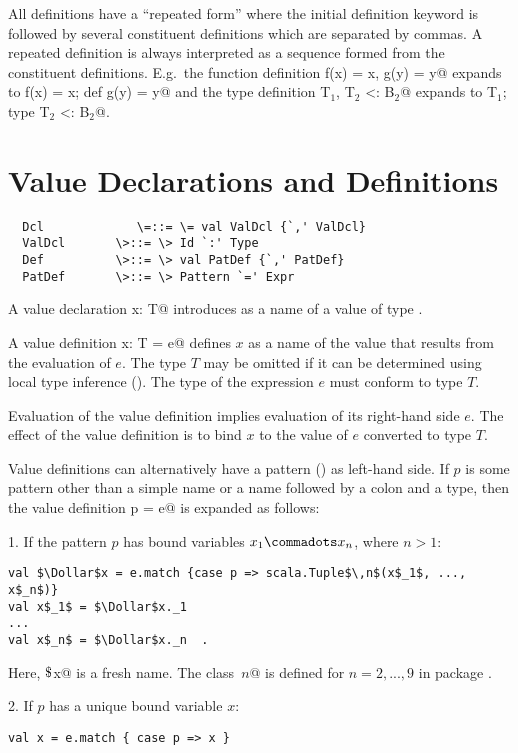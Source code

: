 \documentclass[11pt]{report}
\begin{document}
All definitions have a ``repeated form'' where the initial
definition keyword is followed by several constituent definitions
which are separated by commas.  A repeated definition is
always interpreted as a sequence formed from the
constituent definitions. E.g.\ the function definition
\verb@def f(x) = x, g(y) = y@ expands to
\verb@def f(x) = x; def g(y) = y@ and
the type definition
\verb@type T$_1$, T$_2$ <: B$_2$@ expands to
\verb@type T$_1$; type T$_2$ <: B$_2$@.

\section{Value Declarations and Definitions}
\label{sec:valdef}

\syntax\begin{verbatim}
  Dcl             \=::= \= val ValDcl {`,' ValDcl}
  ValDcl       \>::= \> Id `:' Type
  Def          \>::= \> val PatDef {`,' PatDef}
  PatDef       \>::= \> Pattern `=' Expr
\end{verbatim}

A value declaration \verb@val x: T@ introduces \verb@x@ as a name of a value of
type \verb@T@.  

A value definition \verb@val x: T = e@ defines $x$ as a name of the value
that results from the evaluation of $e$. The type $T$ may be omitted
if it can be determined using local type inference
().  The type of the expression $e$ must
conform to type $T$.

Evaluation of the value definition implies evaluation of its
right-hand side $e$.  The effect of the value definition is to bind
$x$ to the value of $e$ converted to type $T$.

Value definitions can alternatively have a pattern
() as left-hand side.  If $p$ is some pattern other
than a simple name or a name followed by a colon and a type, then the
value definition \verb@val p = e@ is expanded as follows:

1. If the pattern $p$ has bound variables $x_1 \commadots x_n$, where $n > 1$:
\begin{verbatim}
val $\Dollar$x = e.match {case p => scala.Tuple$\,n$(x$_1$, ..., x$_n$)}
val x$_1$ = $\Dollar$x._1
...
val x$_n$ = $\Dollar$x._n  .
\end{verbatim}
Here, \verb@$\Dollar$x@ is a fresh name.  The class
\verb@Tuple$\,n$@ is defined for $n = 2,...,9$ in package
\verb@scala@.

2. If $p$ has a unique bound variable $x$:
\begin{verbatim}
val x = e.match { case p => x }
\end{verbatim}
\end{document}
